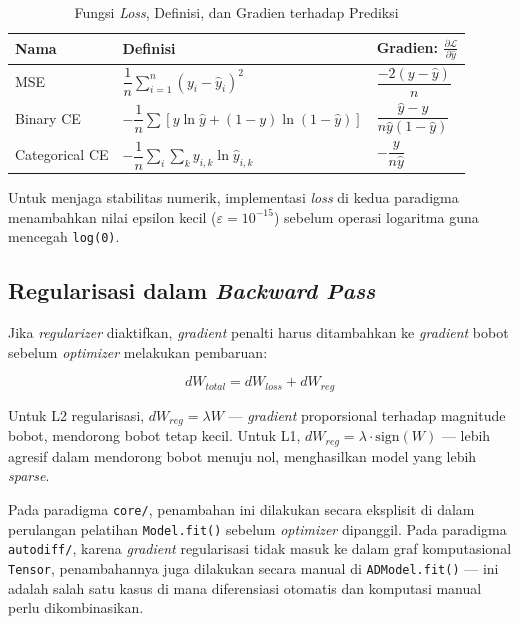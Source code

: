 \begin{table}[H]
    \centering
    \caption{Fungsi \textit{Loss}, Definisi, dan Gradien terhadap Prediksi}
    \begin{tabular}{p{2.8cm}p{5.5cm}p{4.5cm}}
        \toprule
        \textbf{Nama} & \textbf{Definisi} & \textbf{Gradien: } $\frac{\partial \mathcal{L}}{\partial \hat{y}}$ \\
        \midrule
        MSE & $\dfrac{1}{n}\displaystyle\sum_{i=1}^{n}(y_i - \hat{y}_i)^2$ & $\dfrac{-2(y - \hat{y})}{n}$ \\[12pt]
        Binary CE & $-\dfrac{1}{n}\displaystyle\sum [y \ln\hat{y} + (1{-}y)\ln(1{-}\hat{y})]$ & $\dfrac{\hat{y} - y}{n\hat{y}(1-\hat{y})}$ \\[12pt]
        Categorical CE & $-\dfrac{1}{n}\displaystyle\sum_i \sum_k y_{i,k} \ln \hat{y}_{i,k}$ & $-\dfrac{y}{n\hat{y}}$ \\
        \bottomrule
    \end{tabular}
    \label{tab:loss}
\end{table}

Untuk menjaga stabilitas numerik, implementasi \textit{loss} di kedua paradigma menambahkan nilai epsilon kecil ($\varepsilon = 10^{-15}$) sebelum operasi logaritma guna mencegah \texttt{log(0)}.

\subsection{Regularisasi dalam \textit{Backward Pass}}

Jika \textit{regularizer} diaktifkan, \textit{gradient} penalti harus ditambahkan ke \textit{gradient} bobot sebelum \textit{optimizer} melakukan pembaruan:

\begin{equation}
    dW_{total} = dW_{loss} + dW_{reg}
\end{equation}

Untuk L2 regularisasi, $dW_{reg} = \lambda W$ --- \textit{gradient} proporsional terhadap magnitude bobot, mendorong bobot tetap kecil. Untuk L1, $dW_{reg} = \lambda \cdot \text{sign}(W)$ --- lebih agresif dalam mendorong bobot menuju nol, menghasilkan model yang lebih \textit{sparse}.

Pada paradigma \texttt{core/}, penambahan ini dilakukan secara eksplisit di dalam perulangan pelatihan \texttt{Model.fit()} sebelum \textit{optimizer} dipanggil. Pada paradigma \texttt{autodiff/}, karena \textit{gradient} regularisasi tidak masuk ke dalam graf komputasional \texttt{Tensor}, penambahannya juga dilakukan secara manual di \texttt{ADModel.fit()} --- ini adalah salah satu kasus di mana diferensiasi otomatis dan komputasi manual perlu dikombinasikan.

